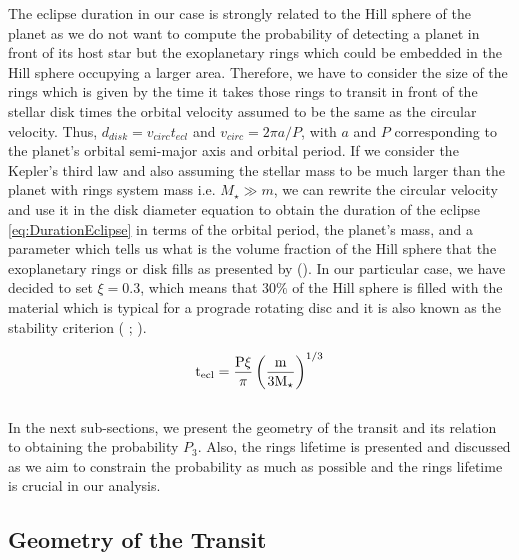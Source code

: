 The eclipse duration in our case is strongly related to the Hill sphere of the planet as we do not want to compute the probability of detecting a planet in front of its host star but the exoplanetary rings which could be embedded in the Hill sphere occupying a larger area. Therefore, we have to consider the size of the rings which is given by the time it takes those rings to transit in front of the stellar disk times the orbital velocity assumed to be the same as the circular velocity. Thus, $d_{disk} = v_{circ} t_{ecl}$ and $v_{circ} = 2\pi a/P$, with $a$ and $P$ corresponding to the planet's orbital semi-major axis and orbital period. If we consider the Kepler's third law and also assuming the stellar mass to be much larger than the planet with rings system mass i.e. $M_\star \gg m$, we can rewrite the circular velocity and use it in the disk diameter equation to obtain the duration of the eclipse \autoref{eq:DurationEclipse} in terms of the orbital period, the planet's mass, and a parameter which tells us what is the volume fraction of the Hill sphere that the exoplanetary rings or disk fills as presented by  (\citeyear{2017MNRAS.471..740O}). In our particular case, we have decided to set $\xi = 0.3$, which means that $30\%$ of the Hill sphere is filled with the material which is typical for a prograde rotating disc and it is also known as the stability criterion ( \citeyear{1998ApJ...508..707Q};  \citeyear{2003AJ....126..398N}).

\begingroup
\Large
\begin{equation}
\textnormal{t}_{\textnormal{ecl}} = \frac{\textnormal{P} \xi}{\pi} \left( \frac{\textnormal{m}}{3\textnormal{M}_\star} \right)^{1/3}
 \label{eq:DurationEclipse}
\end{equation}
\endgroup\\

In the next sub-sections, we present the geometry of the transit and its relation to obtaining the probability $P_3$. Also, the rings lifetime is presented and discussed as we aim to constrain the probability as much as possible and the rings lifetime is crucial in our analysis.   

\subsection{Geometry of the Transit} \label{subsec:GeometryTransit}

